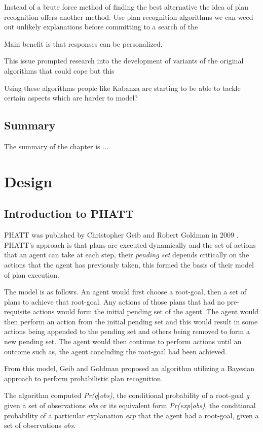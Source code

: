 \documentclass[parskip]{cs4rep}
\begin{document}
Instead of a brute force method of finding the best alternative the idea of plan recognition offers another method. Use plan recognition algorithms we can weed out unlikely explanations before committing to a search of the 

Main benefit is that responses can be personalized.

This issue prompted research into the development of variants of the original algorithms that could cope but this 

Using these algorithms people like Kabanza are starting to be able to tackle certain aspects which are harder to model?

\section{Summary}

The summary of the chapter is ...

\chapter{Design}

\section{Introduction to PHATT}

PHATT was published by Christopher Geib and Robert Goldman in 2009 \cite{Geib:2009:PPR:1550966.1551246}. PHATT's approach is that plans are executed dynamically and the set of actions that an agent can take at each step, their \textit{pending set} depends critically on the actions that the agent has previously taken, this formed the basis of their model of plan execution.

The model is as follows. An agent would first choose a root-goal, then a set of plans to achieve that root-goal. Any actions of those plans that had no pre-requisite actions would form the initial pending set of the agent. The agent would then perform an action from the initial pending set and this would result in some actions being appended to the pending set and others being removed to form a new pending set. The agent would then continue to perform actions until an outcome such as, the agent concluding the root-goal had been achieved.

From this model, Geib and Goldman proposed an algorithm utilizing a Bayesian approach to perform probabilistic plan recognition. 

The algorithm computed \textit{Pr(g}|\textit{obs)}, the conditional probability of a root-goal \textit{g} given a set of observations \textit{obs} or its equivalent form \textit{Pr(exp}|\textit{obs)}, the conditional probability of a particular explanation \textit{exp} that the agent had a root-goal, given a set of observations \textit{obs}.
\end{document}
